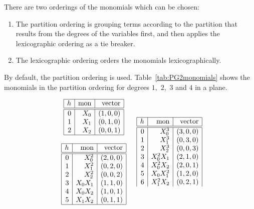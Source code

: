 There are two orderings of the monomials which can be chosen:
\begin{enumerate}
\item
The partition ordering is grouping terms according to the partition 
that results from the degrees of the variables first, 
and then applies the lexicographic ordering as a tie breaker. 
\item
The lexicographic ordering orders the monomials lexicographically.
\end{enumerate}
By default, the partition ordering is used.
Table~\ref{tab:PG2monomials} shows the monomials in the partition ordering 
for degrees $1,$ $2,$ $3$ and $4$ in a plane.
\begin{table}
$$
\begin{array}{c}
\begin{array}{|r|r|r|}
\hline
h &  \mbox{mon} & \mbox{vector} \\
\hline
\hline
0 & X_0 & ( 1, 0, 0 )\\
1 & X_1 & ( 0, 1, 0 )\\
2 & X_2 & ( 0, 0, 1 )\\
\hline
\end{array}\\
\ \\
\begin{array}{|r|r|r|}
\hline
h &  \mbox{mon} & \mbox{vector} \\
\hline
\hline
0 & X_0^2 & ( 2, 0, 0 )\\
1 & X_1^2 & ( 0, 2, 0 )\\
2 & X_2^2 & ( 0, 0, 2 )\\
3 & X_0X_1 & ( 1, 1, 0 )\\
4 & X_0X_2 & ( 1, 0, 1 )\\
5 & X_1X_2 & ( 0, 1, 1 )\\
\hline
\end{array}
\end{array}
\quad
\begin{array}{|r|r|r|}
\hline
h &  \mbox{mon} & \mbox{vector} \\
\hline
\hline
0 & X_0^3 & ( 3, 0, 0 )\\
1 & X_1^3 & ( 0, 3, 0 )\\
2 & X_2^3 & ( 0, 0, 3 )\\
3 & X_0^2X_1 & ( 2, 1, 0 )\\
4 & X_0^2X_2 & ( 2, 0, 1 )\\
5 & X_0X_1^2 & ( 1, 2, 0 )\\
6 & X_1^2X_2 & ( 0, 2, 1 )\\

\end{array}$$
\end{table}
